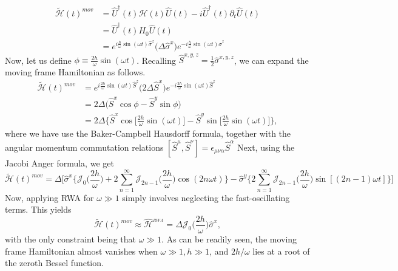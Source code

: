 \documentclass[aps,prb,reprint,showpacs,floatfix,superscriptaddress, onecolumn, nofootinbib, 9pt]{revtex4-2}
\begin{document}
\begin{enumerate}
{\begin{align}
    \tilde{\mathcal{H}}(t)^{mov} &=\hat{U}^\dagger(t) \mathcal{H}(t) \hat{U}(t) - i \hat{U}^\dagger(t) \partial_t \hat{U}(t)\nonumber\\
    &= \hat{U}^\dagger(t) H_0 \hat{U}(t)\nonumber\\
    &= e^{i \frac{h}{\omega} \sin(\omega t)\hat{\sigma}^z} \Big(\Delta \hat{\sigma}^x\Big) e^{-i \frac{h}{\omega} \sin(\omega t)\hat{\sigma}^z}
    \end{align}
    Now, let us define $\phi \equiv \frac{2h}{\omega} \sin(\omega t)$. Recalling $\hat{S}^{x,y,z} = \frac12 \hat{\sigma}^{x,y,z}$, we can expand the moving frame Hamiltonian as follows.
    \begin{align}
    \tilde{\mathcal{H}}(t)^{mov} &= e^{i \frac{2h}{\omega} \sin(\omega t)\hat{S}^z} \Big(2\Delta \hat{S}^x\Big) e^{-i \frac{2h}{\omega} \sin(\omega t)\hat{S}^z}\nonumber\\
    &= 2\Delta \Big(\hat{S}^x \cos{\phi} - \hat{S}^y \sin{\phi}\Big)\nonumber\\
    &= 2\Delta \bigg\{\hat{S}^x\cos\Big[\frac{2h}{\omega}\sin(\omega t)\Big] - \hat{S}^y\sin\Big[\frac{2h}{\omega}\sin(\omega t)\Big]\bigg\},
    \end{align}
    where we have use the Baker-Campbell Hausdorff formula, together with the angular momentum commutation relations $[\hat{S}^\mu, \hat{S}^\nu]=\epsilon_{\mu\nu\alpha}\hat{S}^\alpha$
    Next, using the Jacobi Anger formula, we get
    \begin{equation}
    \tilde{\mathcal{H}}(t)^{mov} = \Delta \Bigg[\hat{\sigma}^x \bigg\{\mathcal{J}_0\Big(\frac{2h}{\omega}\Big) + 2 \sum_{n=1}^{\infty} \mathcal{J}_{2n-1}\Big(\frac{2h}{\omega}\Big)\cos(2n\omega t)\bigg\} -\hat{\sigma}^y\bigg\{2\sum_{n=1}^{\infty} \mathcal{J}_{2n-1}\Big(\frac{2h}{\omega}\Big) \sin\left[(2n-1)\omega t\right]\bigg\}\Bigg]
    \label{eq:hexact}
    \end{equation}
    Now, applying RWA for $\omega \gg 1$ simply involves neglecting the fast-oscillating terms. This yields
    \begin{equation}
    \tilde{\mathcal{H}}(t)^{mov}\approx\hat{\mathcal{H}}^{_{RWA}} = \Delta \mathcal{J}_0 \Big(\frac{2h}{\omega}\Big) \hat{\sigma}^x,
    \end{equation}
with the only constraint being that $\omega \gg 1$. As can be readily seen, the moving frame Hamiltonian almost vanishes when $\omega\gg 1, h\gg 1$, and $2h/\omega$ lies at a root of the zeroth Bessel function.

}
\end{enumerate}
\end{document}
